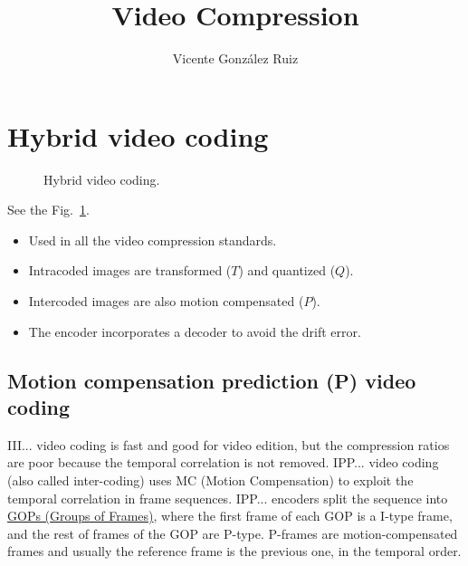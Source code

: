 \title{Video Compression}
\author{Vicente González Ruiz}
\maketitle
\tableofcontents

\section{}

\section{Hybrid video coding}

\begin{figure}
  \caption{Hybrid video coding.}
  \label{fig:hybrid_coding}
\end{figure}

See the Fig.~\ref{fig:hybrid_coding}.

\begin{itemize}
\tightlist
\item
  Used in all the video compression standards.
\item
  Intracoded images are transformed ($T$) and quantized ($Q$).
\item
  Intercoded images are also motion compensated ($P$).
\item
  The encoder incorporates a decoder to avoid the drift error.
\end{itemize}


\subsection{Motion compensation prediction (P) video coding}
III... video coding is fast and good for video edition, but the
compression ratios are poor because the temporal correlation is not
removed. IPP... video coding (also called inter-coding) uses MC
(Motion Compensation) to exploit the temporal correlation in frame
sequences. IPP... encoders split the sequence into
\href{https://en.wikipedia.org/wiki/Group_of_pictures}{GOPs (Groups of
  Frames)}, where the first frame of each GOP is a I-type frame, and
the rest of frames of the GOP are P-type. P-frames are
motion-compensated frames and usually the reference frame is the
previous one, in the temporal order.

